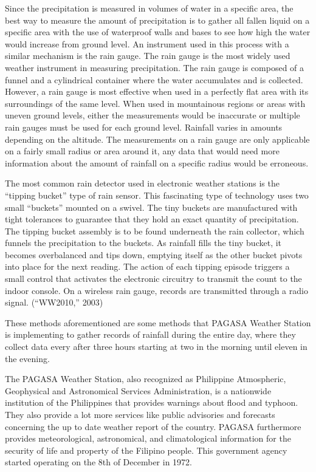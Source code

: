 	Since the precipitation is measured in volumes of water in a specific area, the best way to measure the amount of precipitation is to gather all fallen liquid on a specific area with the use of waterproof walls and bases to see how high the water would increase from ground level.  An instrument used in this process with a similar mechanism is the rain gauge.  The rain gauge is the most widely used weather instrument in measuring precipitation.  The rain gauge is composed of a funnel and a cylindrical container where the water accumulates and is collected. However, a rain gauge is most effective when used in a perfectly flat area with its surroundings of the same level.  When used in mountainous regions or areas with uneven ground levels, either the measurements would be inaccurate or multiple rain gauges must be used for each ground level. Rainfall varies in amounts depending on the altitude.  The measurements on a rain gauge are only applicable on a fairly small radius or area around it, any data that would need more information about the amount of rainfall on a specific radius would be erroneous.
	
	The most common rain detector used in electronic weather stations is the “tipping bucket” type of rain sensor.  This fascinating type of technology uses two small “buckets” mounted on a swivel. The tiny buckets are manufactured with tight tolerances to guarantee that they hold an exact quantity of precipitation.  The tipping bucket assembly is to be found underneath the rain collector, which funnels the precipitation to the buckets.  As rainfall fills the tiny bucket, it becomes overbalanced and tips down, emptying itself as the other bucket pivots into place for the next reading. The action of each tipping episode triggers a small control that activates the electronic circuitry to transmit the count to the indoor console.  On a wireless rain gauge, records are transmitted through a radio signal. (“WW2010,” 2003)
	
	These methods aforementioned are some methods that PAGASA Weather Station is implementing to gather records of rainfall during the entire day, where they collect data every after three hours starting at two in the morning until eleven in the evening.
	
	The PAGASA Weather Station, also recognized as Philippine Atmospheric, Geophysical and Astronomical Services Administration, is a nationwide institution of the Philippines that provides warnings about flood and typhoon.  They also provide a lot more services like public advisories and forecasts concerning the up to date weather report of the country.  PAGASA furthermore provides meteorological, astronomical, and climatological information for the security of life and property of the Filipino people.  This government agency started operating on the 8th of December in 1972.
	
